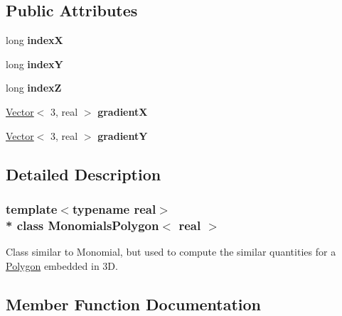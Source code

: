 \subsection*{Public Attributes}
\begin{DoxyCompactItemize}
\item 
long {\bfseries indexX}\hypertarget{class_monomials_polygon_a67653a8a7045863c5ce2789e327fdcfd}{}\label{class_monomials_polygon_a67653a8a7045863c5ce2789e327fdcfd}

\item 
long {\bfseries indexY}\hypertarget{class_monomials_polygon_a2599e7ba98876d6d1c2e7510e4fc7b34}{}\label{class_monomials_polygon_a2599e7ba98876d6d1c2e7510e4fc7b34}

\item 
long {\bfseries indexZ}\hypertarget{class_monomials_polygon_a2367e9b41cf7615289ac8d30f000e732}{}\label{class_monomials_polygon_a2367e9b41cf7615289ac8d30f000e732}

\item 
\hyperlink{class_point}{Vector}$<$ 3, real $>$ {\bfseries gradientX}\hypertarget{class_monomials_polygon_a0e83af1a5e822260f79c0fb235480bfd}{}\label{class_monomials_polygon_a0e83af1a5e822260f79c0fb235480bfd}

\item 
\hyperlink{class_point}{Vector}$<$ 3, real $>$ {\bfseries gradientY}\hypertarget{class_monomials_polygon_a13406aff842b61fc89f000697eb4b31b}{}\label{class_monomials_polygon_a13406aff842b61fc89f000697eb4b31b}

\end{DoxyCompactItemize}


\subsection{Detailed Description}
\subsubsection*{template$<$typename real$>$\\*
class Monomials\+Polygon$<$ real $>$}

Class similar to Monomial, but used to compute the similar quantities for a \hyperlink{class_polygon}{Polygon} embedded in 3D. 

\subsection{Member Function Documentation}
